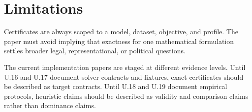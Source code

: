 \section{Limitations}

Certificates are always scoped to a model, dataset, objective, and profile.
The paper must avoid implying that exactness for one mathematical formulation
settles broader legal, representational, or political questions.

The current implementation papers are staged at different evidence levels.
Until U.16 and U.17 document solver contracts and fixtures, exact certificates
should be described as target contracts. Until U.18 and U.19 document empirical
protocols, heuristic claims should be described as validity and comparison
claims rather than dominance claims.
